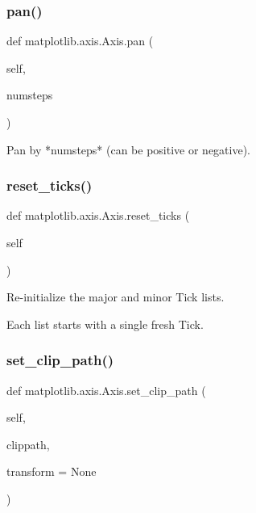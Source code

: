 \mbox{\label{classmatplotlib_1_1axis_1_1Axis_a8f67cc32b23a26c75d18b68095162f4d}} 
\subsubsection{\texorpdfstring{pan()}{pan()}}
{\footnotesize\ttfamily def matplotlib.\+axis.\+Axis.\+pan (\begin{DoxyParamCaption}\item[{}]{self,  }\item[{}]{numsteps }\end{DoxyParamCaption})}

\begin{DoxyVerb}Pan by *numsteps* (can be positive or negative).\end{DoxyVerb}
 \mbox{\label{classmatplotlib_1_1axis_1_1Axis_a8d27a927baa9188b6ed00dd2f0997f13}} 
\subsubsection{\texorpdfstring{reset\+\_\+ticks()}{reset\_ticks()}}
{\footnotesize\ttfamily def matplotlib.\+axis.\+Axis.\+reset\+\_\+ticks (\begin{DoxyParamCaption}\item[{}]{self }\end{DoxyParamCaption})}

\begin{DoxyVerb}Re-initialize the major and minor Tick lists.

Each list starts with a single fresh Tick.
\end{DoxyVerb}
 \mbox{\label{classmatplotlib_1_1axis_1_1Axis_aaca09a77d695efb654f27261ccc856cd}} 
\subsubsection{\texorpdfstring{set\+\_\+clip\+\_\+path()}{set\_clip\_path()}}
{\footnotesize\ttfamily def matplotlib.\+axis.\+Axis.\+set\+\_\+clip\+\_\+path (\begin{DoxyParamCaption}\item[{}]{self,  }\item[{}]{clippath,  }\item[{}]{transform = {\ttfamily None} }\end{DoxyParamCaption})}

